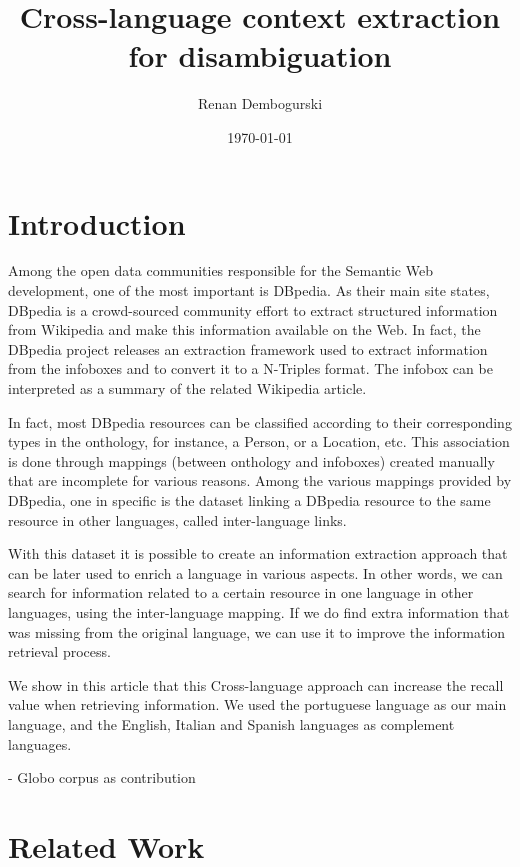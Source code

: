 \documentclass[10pt,a4paper]{llncs}
\title{Cross-language context extraction for disambiguation}
\author{Renan Dembogurski}
\date{\today}
\begin{document}
\maketitle

\begin{abstract}
\end{abstract}

\section{Introduction}

Among the open data communities responsible for the Semantic Web development, one of the most important is DBpedia. As their main site states, DBpedia is a crowd-sourced community effort to extract structured information from Wikipedia and make this information available on the Web. In fact, the DBpedia project releases an extraction framework used to extract information from the infoboxes and to convert it to a N-Triples format. The infobox can be interpreted as a summary of the related Wikipedia article.

In fact, most DBpedia resources can be classified according to their corresponding types in the onthology, for instance, a Person, or a Location, etc. This association is done through mappings (between onthology and infoboxes) created manually that are incomplete for various reasons. Among the various mappings provided by DBpedia, one in specific is the dataset linking a DBpedia resource to the same resource in other languages, called inter-language links.

With this dataset it is possible to create an information extraction approach that can be later used to enrich a language in various aspects. In other words, we can search for information related to a certain resource in one language in other languages, using the inter-language mapping. If we do find extra information that was missing from the original language, we can use it to improve the information retrieval process.

We show in this article that this Cross-language approach can increase the recall value when retrieving information. We used the portuguese language as our main language, and the English, Italian and Spanish languages as complement languages.

- Globo corpus as contribution

\section{Related Work}
\end{document}
